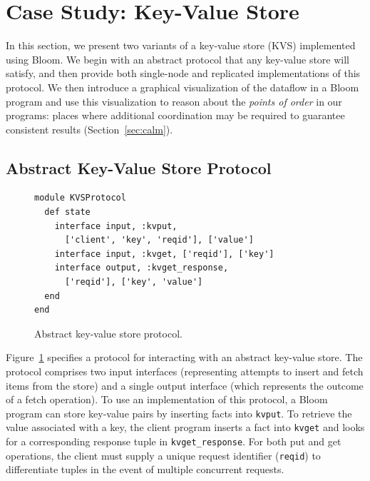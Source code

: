 \section{Case Study: Key-Value Store}
\label{sec:kvs}
In this section, we present two variants of a key-value store (KVS) implemented
using Bloom. We begin with an abstract protocol that any key-value store will
satisfy, and then provide both single-node and replicated implementations of
this protocol. We then introduce a graphical visualization of the dataflow in a
Bloom program and use this visualization to reason about the \emph{points of
  order} in our programs: places where additional coordination may be required
to guarantee consistent results (Section~\ref{sec:calm}).

\subsection{Abstract Key-Value Store Protocol}

\begin{figure}[t]
\begin{scriptsize}
\begin{lstlisting}
module KVSProtocol
  def state
    interface input, :kvput, 
      ['client', 'key', 'reqid'], ['value']
    interface input, :kvget, ['reqid'], ['key']
    interface output, :kvget_response, 
      ['reqid'], ['key', 'value']
  end
end
\end{lstlisting}
\centering
\vspace{-10pt}
\caption{Abstract key-value store protocol.}
\label{fig:kvs-proto}
\end{scriptsize}
\vspace{-2pt}
\end{figure}

Figure~\ref{fig:kvs-proto} specifies a protocol for interacting with an abstract
key-value store. The protocol comprises two input interfaces (representing
attempts to insert and fetch items from the store) and a single output interface
(which represents the outcome of a fetch operation). To use an implementation of
this protocol, a Bloom program can store key-value pairs by inserting facts into
\texttt{kvput}. To retrieve the value associated with a key, the client program
inserts a fact into \texttt{kvget} and looks for a corresponding response tuple
in \texttt{kvget\_response}. For both put and get operations, the client
must supply a unique request identifier (\texttt{reqid}) to differentiate tuples
in the event of multiple concurrent requests.

